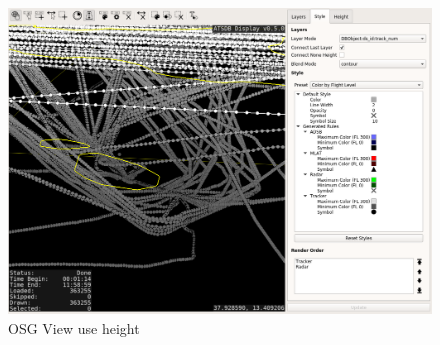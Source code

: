 \begin{figure}[H]
    \hspace*{-2.5cm}
    \includegraphics[width=19cm,frame]{../screenshots/osgview_use_height.png}
  \caption{OSG View use height}
\end{figure} 
